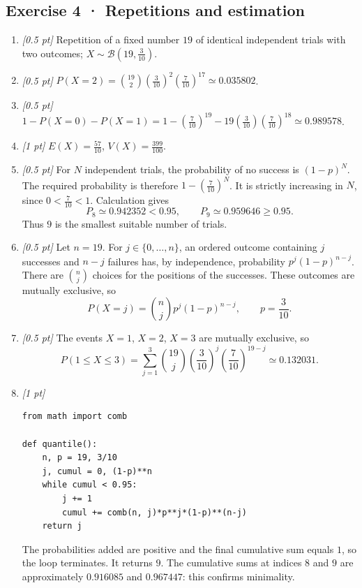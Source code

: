 \subsection*{Exercise 4 · Repetitions and estimation}\begin{enumerate}

\item \textit{[0.5 pt]} Repetition of a fixed number $19$ of identical independent trials with two outcomes; $X\sim\mathcal B(19,\frac{3}{10})$.

\item \textit{[0.5 pt]} $P(X=2)=\binom{19}2(\frac{3}{10})^2(\frac{7}{10})^{17}\simeq0.035802$.

\item \textit{[0.5 pt]} $1-P(X=0)-P(X=1)=1-(\frac{7}{10})^{19}-19(\frac{3}{10})(\frac{7}{10})^{18}\simeq0.989578$.

\item \textit{[1 pt]} $E(X)=\frac{57}{10}$, $V(X)=\frac{399}{100}$.

\item \textit{[0.5 pt]} For $N$ independent trials, the probability of no success is $(1-p)^N$. The required probability is therefore $1-(\frac{7}{10})^N$. It is strictly increasing in $N$, since $0<\frac{7}{10}<1$. Calculation gives
\[P_{8}\simeq0.942352<0.95,\qquad P_{9}\simeq0.959646\ge0.95.\]
Thus $9$ is the smallest suitable number of trials.

\item \textit{[0.5 pt]} Let $n=19$. For $j\in\{0,\ldots,n\}$, an ordered outcome containing $j$ successes and $n-j$ failures has, by independence, probability $p^j(1-p)^{n-j}$. There are $\binom nj$ choices for the positions of the successes. These outcomes are mutually exclusive, so
\[P(X=j)=\binom nj p^j(1-p)^{n-j},\qquad p=\frac{3}{10}.\]

\item \textit{[0.5 pt]} The events $X=1$, $X=2$, $X=3$ are mutually exclusive, so
\[P(1\le X\le3)=\sum_{j=1}^3\binom{19}j(\frac{3}{10})^j(\frac{7}{10})^{19-j}\simeq0.132031.\]


\item \textit{[1 pt]} 
\begin{lstlisting}
from math import comb

def quantile():
    n, p = 19, 3/10
    j, cumul = 0, (1-p)**n
    while cumul < 0.95:
        j += 1
        cumul += comb(n, j)*p**j*(1-p)**(n-j)
    return j
\end{lstlisting}
The probabilities added are positive and the final cumulative sum equals $1$, so the loop terminates. It returns $9$. The cumulative sums at indices $8$ and $9$ are approximately $0.916085$ and $0.967447$: this confirms minimality.

\end{enumerate}

